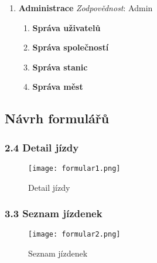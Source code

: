 \documentclass[11pt]{article}
\begin{document}
\begin{enumerate}
    \item \textbf{Administrace}
        \textit{Zodpovědnost}: Admin
        \begin{enumerate}
            \item \textbf{Správa uživatelů}
            \item \textbf{Správa společností}
            \item \textbf{Správa stanic}
            \item \textbf{Správa měst}
        \end{enumerate}
\end{enumerate}


\subsection{Návrh formulářů}

\subsubsection*{2.4 Detail jízdy}

\begin{figure}[H]
    \texttt{[image: formular1.png]}
    \centering
    \caption{Detail jízdy}
    \label{vystup}
\end{figure}

\subsubsection*{3.3 Seznam jízdenek}

\begin{figure}[H]
    \texttt{[image: formular2.png]}
    \centering
    \caption{Seznam jízdenek}
    \label{vystup}
\end{figure}




























\end{document}
